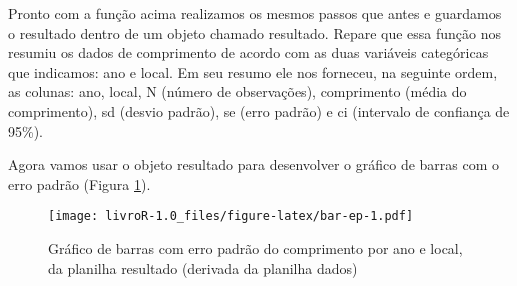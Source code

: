 \documentclass[titlepage, oneside, openany, a4paper]{book}
\newenvironment{Shaded}{\begin{snugshade}}{\end{snugshade}}
\newcommand{\DataTypeTok}[1]{\textcolor[rgb]{0.13,0.29,0.53}{#1}}
\newcommand{\DecValTok}[1]{\textcolor[rgb]{0.00,0.00,0.81}{#1}}
\newcommand{\FloatTok}[1]{\textcolor[rgb]{0.00,0.00,0.81}{#1}}
\newcommand{\KeywordTok}[1]{\textcolor[rgb]{0.13,0.29,0.53}{\textbf{#1}}}
\newcommand{\NormalTok}[1]{#1}
\newcommand{\OperatorTok}[1]{\textcolor[rgb]{0.81,0.36,0.00}{\textbf{#1}}}
\newcommand{\OtherTok}[1]{\textcolor[rgb]{0.56,0.35,0.01}{#1}}
\newcommand{\StringTok}[1]{\textcolor[rgb]{0.31,0.60,0.02}{#1}}
\begin{document}
Pronto com a função acima realizamos os mesmos passos que antes e guardamos o resultado dentro de um objeto chamado resultado. Repare que essa função nos resumiu os dados de comprimento de acordo com as duas variáveis categóricas que indicamos: ano e local. Em seu resumo ele nos forneceu, na seguinte ordem, as colunas: ano, local, N (número de observações), comprimento (média do comprimento), sd (desvio padrão), se (erro padrão) e ci (intervalo de confiança de 95\%).

Agora vamos usar o objeto resultado para desenvolver o gráfico de barras com o erro padrão (Figura \ref{fig:bar-ep}).

\begin{Shaded}
\end{Shaded}

\begin{figure}
\centering
\texttt{[image: livroR-1.0\_files/figure-latex/bar-ep-1.pdf]}
\caption{\label{fig:bar-ep}Gráfico de barras com erro padrão do comprimento por ano e local, da planilha resultado (derivada da planilha dados)}
\end{figure}
\end{document}
